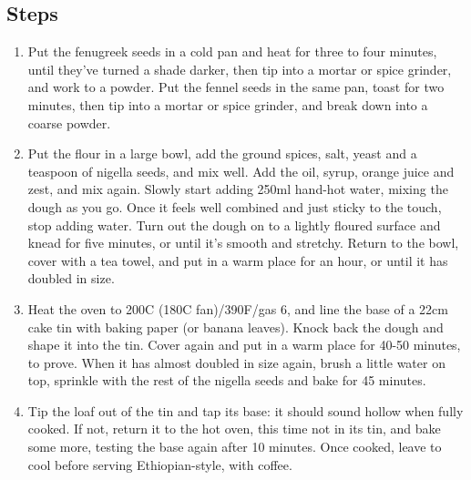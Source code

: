 \documentclass{book}
\begin{document}
\subsection*{Steps}
\begin{enumerate}
\item Put the fenugreek seeds in a cold pan and heat for three to four minutes, until they’ve turned a shade darker, then tip into a mortar or spice grinder, and work to a powder. Put the fennel seeds in the same pan, toast for two minutes, then tip into a mortar or spice grinder, and break down into a coarse powder. 
\item Put the flour in a large bowl, add the ground spices, salt, yeast and a teaspoon of nigella seeds, and mix well. Add the oil, syrup, orange juice and zest, and mix again. Slowly start adding 250ml hand-hot water, mixing the dough as you go. Once it feels well combined and just sticky to the touch, stop adding water. Turn out the dough on to a lightly floured surface and knead for five minutes, or until it’s smooth and stretchy. Return to the bowl, cover with a tea towel, and put in a warm place for an hour, or until it has doubled in size.
\item Heat the oven to 200C (180C fan)/390F/gas 6, and line the base of a 22cm cake tin with baking paper (or banana leaves). Knock back the dough and shape it into the tin. Cover again and put in a warm place for 40-50 minutes, to prove. When it has almost doubled in size again, brush a little water on top, sprinkle with the rest of the nigella seeds and bake for 45 minutes.
\item Tip the loaf out of the tin and tap its base: it should sound hollow when fully cooked. If not, return it to the hot oven, this time not in its tin, and bake some more, testing the base again after 10 minutes. Once cooked, leave to cool before serving Ethiopian-style, with coffee.
\end{enumerate}
\newpage
\end{document}
